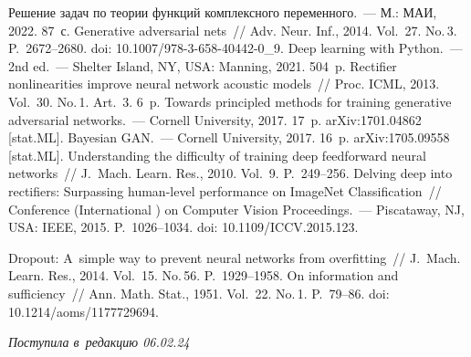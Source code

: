 \begin{multicols}{2}
{{\begin{thebibliography}{99}
 Решение задач по теории функций 
комплексного переменного.~--- М.: МАИ, 2022. 87~с.
 Generative adversarial nets~// Adv. Neur. Inf., 
2014. Vol.~27. No.\,3. P.~2672--2680. doi: 10.1007/978-3-658-40442-0\_9.
 Deep learning with Python.~--- 2nd ed.~--- Shelter Island, NY, USA: Manning, 
2021. 504~p.
 Rectifier nonlinearities improve neural network 
acoustic models~// Proc. ICML, 2013. Vol.~30. No.\,1. Art.~3. 6~p.
 Towards principled methods for training generative adversarial 
networks.~--- Cornell University, 2017. 17~p. arXiv:1701.04862 [stat.ML]. 
 Bayesian GAN.~--- Cornell University, 2017.  16~p. arXiv:1705.09558 
[stat.ML]. 
 Understanding the difficulty of training deep feedforward neural 
networks~// J.~Mach. Learn. Res., 2010. Vol.~9. P.~249--256.
 Delving deep into rectifiers: Surpassing human-level 
performance on ImageNet Classification~// Conference (International ) on Computer 
Vision Proceedings.~--- Piscataway, NJ, USA: IEEE, 2015. P.~1026--1034. doi: 10.1109/ICCV.2015.123.

 Dropout: 
A~simple way to prevent neural networks from overfitting~// J.~Mach. Learn. Res., 
2014. Vol.~15. No.\,56. P.~1929--1958.
 On information and sufficiency~// Ann. Math. Stat., 1951. 
Vol.~22. No.\,1. P.~79--86. doi: 10.1214/aoms/1177729694.

\end{thebibliography}

 }
 }

\end{multicols}

\vspace*{-6pt}

\hfill{\small\textit{Поступила в~редакцию 06.02.24}}



\newpage

\vspace*{-28pt}

